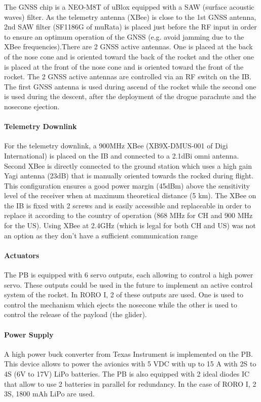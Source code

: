 The GNSS chip is a NEO-M8T of uBlox equipped with a SAW (surface acoustic waves) filter. As the telemetry antenna (XBee) is close to the 1st GNSS antenna, 2nd SAW filter (SF1186G of muRata) is placed just before the RF input in order to ensure an optimum operation of the GNSS (e.g. avoid jamming due to the XBee frequencies).There are 2 GNSS active antennas. One is placed at the back of the nose cone and is oriented toward the back of the rocket and the other one is placed at the front of the nose cone and is oriented toward the front of the rocket. The 2 GNSS active antennas are controlled via an RF switch on the IB. The first GNSS antenna is used during ascend of the rocket while the second one is used during the descent, after the deployment of the drogue parachute and the nosecone ejection.

\paragraph{Telemetry Downlink}
 \hfill \break
For the telemetry downlink, a 900MHz XBee (XB9X-DMUS-001 of Digi International) is placed on the IB and connected to a 2.1dBi omni antenna. Second XBee is directly connected to the ground station which uses a high gain Yagi antenna (23dB) that is manually oriented towards the rocked during flight. This configuration ensures a good power margin (45dBm) above the sensitivity level of the receiver when at maximum theoretical distance (5 km). The XBee on the IB is fixed with 2 screws and is easily accessible and replaceable in order to replace it according to the country of operation (868 MHz for CH and 900 MHz for the US). Using XBee at 2.4GHz (which is legal for both CH and US) was not an option as they don't have a sufficient communication range

\paragraph{Actuators}
 \hfill \break
The PB is equipped with 6 servo outputs, each allowing to control a high power servo. These outputs could be used in the future to implement an active control system of the rocket. In RORO I, 2 of these outputs are used. One is used to control the mechanism which ejects the nosecone while the other is used to control the release of the payload (the glider). 

\paragraph{Power Supply}
 \hfill \break
A high power buck converter from Texas Instrument is implemented on the PB. This device allows to power the avionics with 5 VDC with up to 15 A with 2S to 4S (6V to 17V) LiPo batteries. The PB is also equipped with 2 ideal diodes IC that allow to use 2 batteries in parallel for redundancy. In the case of RORO I, 2 3S, 1800 mAh LiPo are used. 

